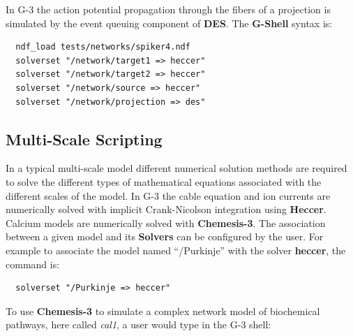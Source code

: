 \documentclass[11pt,3p,twocolumn]{JMN}
\begin{document}
In G-3 the action potential propagation through the fibers of a projection is simulated by the event queuing component of {\bf DES}. The {\bf G-Shell} syntax is:

\begin{tiny}
\begin{verbatim}
  ndf_load tests/networks/spiker4.ndf
  solverset "/network/target1 => heccer"
  solverset "/network/target2 => heccer"
  solverset "/network/source => heccer"
  solverset "/network/projection => des"
\end{verbatim}
\end{tiny}

\subsection{Multi-Scale Scripting}

In  a typical multi-scale model different numerical solution methods are required to solve the different types of mathematical equations associated with the different scales of the model.  In G-3 the cable equation and ion currents are numerically solved with implicit Crank-Nicolson integration using {\bf Heccer}.  Calcium models are numerically solved with {\bf Chemesis-3}. The association between a given model and its {\bf Solvers} can be configured by the user.
For example to associate the model named ``/Purkinje'' with the solver {\bf heccer}, the command is:

\begin{tiny}
\begin{verbatim}
  solverset "/Purkinje => heccer"
\end{verbatim}
\end{tiny}

To use {\bf Chemesis-3} to simulate a complex network model of biochemical pathways, here called {\it cal1}, a user would type in the G-3 shell:
\end{document}
